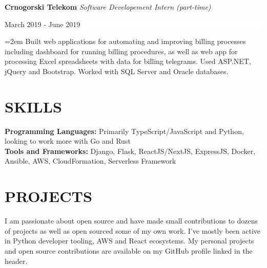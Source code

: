 \documentclass[paper=letter,fontsize=11pt]{scrartcl}
\newcommand{\NewPart}[2]{\section*{\uppercase{#1} \small \normalfont #2}}
\newcommand{\WorkEntry}[5]{
        \noindent \textbf{#1}
        \noindent \small \textit{#2}
        \hfill      %
        \colorbox{White}{%
            \parbox{15em}{%
            \hfill\color{Black}#3}} \par  %
        \noindent \textit{#4} \par        %
        \noindent\hangindent=2em\hangafter=0 \small #5 %
        \normalsize \par}
\newcommand{\Language}[2]{
        \noindent \textbf{#1}
        \noindent \small \textit{#2}}
\begin{document}
\WorkEntry{Crnogorski Telekom}{Software Developement Intern (part-time)}{March 2019 - June 2019}{}
{Built web applications for automating and improving billing processes including
dashboard for running billing procedures, as well as web app for processing Excel spreadsheets
with data for billing telegrams. Used ASP.NET, jQuery and Bootstrap. Worked with SQL
Server and Oracle databases.}

\NewPart{SKILLS}{}

\Language{Programming Languages:}{}{Primarily TypeScript/JavaScript and Python, looking to work more with Go and Rust}\\
\Language{Tools and Frameworks:}{}{Django, Flask, ReactJS/NextJS, ExpressJS, Docker, Ansible, AWS, CloudFormation, Serverless Framework}

\NewPart{Projects}{}

I am passionate about open source and have made small contributions to dozens of
projects as well as open sourced some of my own work. I've mostly been active in
Python developer tooling, AWS and React ecosystems. My personal projects and open
source contributions are available on my GitHub profile linked in the header.
\end{document}
